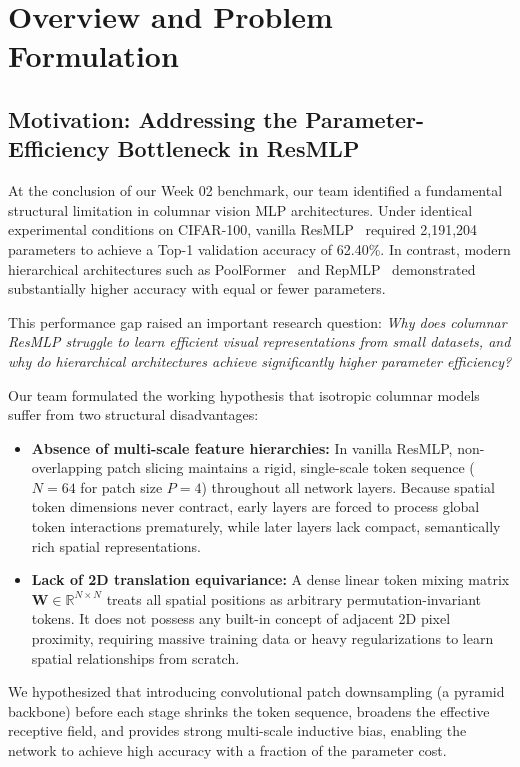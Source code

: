 \section{Overview and Problem Formulation}
\label{section:overview}

\subsection{Motivation: Addressing the Parameter-Efficiency Bottleneck in ResMLP}
At the conclusion of our Week 02 benchmark, our team identified a fundamental structural limitation in columnar vision MLP architectures. Under identical experimental conditions on CIFAR-100, vanilla ResMLP~\cite{touvron2021resmlp} required 2,191,204 parameters to achieve a Top-1 validation accuracy of 62.40\%. In contrast, modern hierarchical architectures such as PoolFormer~\cite{yu2022metaformer} and RepMLP~\cite{ding2022repmlp} demonstrated substantially higher accuracy with equal or fewer parameters.

This performance gap raised an important research question: \textit{Why does columnar ResMLP struggle to learn efficient visual representations from small datasets, and why do hierarchical architectures achieve significantly higher parameter efficiency?}

Our team formulated the working hypothesis that isotropic columnar models suffer from two structural disadvantages:
\begin{itemize}
    \item \textbf{Absence of multi-scale feature hierarchies:} In vanilla ResMLP, non-overlapping patch slicing maintains a rigid, single-scale token sequence ($N = 64$ for patch size $P = 4$) throughout all network layers. Because spatial token dimensions never contract, early layers are forced to process global token interactions prematurely, while later layers lack compact, semantically rich spatial representations.
    \item \textbf{Lack of 2D translation equivariance:} A dense linear token mixing matrix $\mathbf{W} \in \mathbb{R}^{N \times N}$ treats all spatial positions as arbitrary permutation-invariant tokens. It does not possess any built-in concept of adjacent 2D pixel proximity, requiring massive training data or heavy regularizations to learn spatial relationships from scratch.
\end{itemize}

We hypothesized that introducing convolutional patch downsampling (a pyramid backbone) before each stage shrinks the token sequence, broadens the effective receptive field, and provides strong multi-scale inductive bias, enabling the network to achieve high accuracy with a fraction of the parameter cost.

